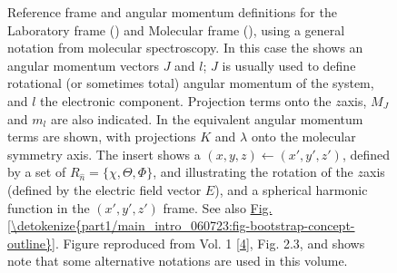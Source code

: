 \documentclass[letterpaper,table,10pt,english]{jupyterBook}
\begin{document}
\begin{figure}[htbp]
\centering
\capstart

\noindent{}
\caption{Reference frame and angular momentum definitions for the Laboratory frame ({\hyperref[\detokenize{backmatter/glossary:term-LF}]{}}) and Molecular frame ({\hyperref[\detokenize{backmatter/glossary:term-MF}]{}}), using a general notation from molecular spectroscopy. In this case the {\hyperref[\detokenize{backmatter/glossary:term-LF}]{}} shows an angular momentum vectors \(J\) and \(l\); \(J\) is usually used to define rotational (or sometimes total) angular momentum of the system, and \(l\) the electronic component. Projection terms onto the {\hyperref[\detokenize{backmatter/glossary:term-LF}]{}} \(z\)\sphinxhyphen{}axis, \(M_J\) and \(m_l\) are also indicated. In the {\hyperref[\detokenize{backmatter/glossary:term-MF}]{}} equivalent angular momentum terms are shown, with projections \(K\) and \(\lambda\) onto the molecular symmetry axis. The insert shows a {\hyperref[\detokenize{backmatter/glossary:term-frame-rotation}]{}} \((x,y,z)\leftarrow(x',y',z')\), defined by a set of {\hyperref[\detokenize{backmatter/glossary:term-Euler-angles}]{}} \(R_{\hat{n}}=\{\chi,\Theta,\Phi\}\), and illustrating the rotation of the \(z\)\sphinxhyphen{}axis (defined by the electric field vector \(E\)), and a spherical harmonic function in the \((x',y',z')\) frame. See also \hyperref[\detokenize{part1/main_intro_060723:fig-bootstrap-concept-outline}]{Fig.\@ \ref{\detokenize{part1/main_intro_060723:fig-bootstrap-concept-outline}}}. Figure reproduced from  Vol. 1 {[}\hyperlink{cite.backmatter/bibliography:id676}{4}{]}, Fig. 2.3, and shows  \sphinxhyphen{} note that some alternative notations are used in this volume.}\label{\detokenize{part1/theory_tensor_formalism_160723:fig-frame-defns}}\end{figure}
\end{document}
